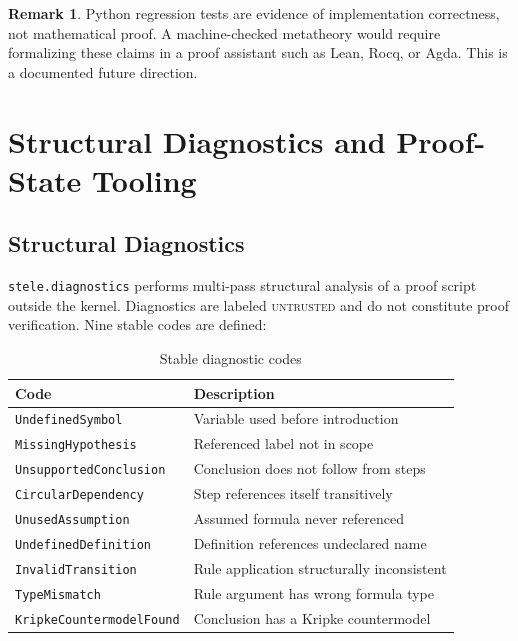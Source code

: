 \documentclass[11pt,a4paper]{article}
\theoremstyle{definition}
\newtheorem{remark}{Remark}
\theoremstyle{plain}
\newcommand{\untrusted}{\textsc{untrusted}}
\begin{document}
\begin{remark}
  Python regression tests are evidence of implementation
  correctness, not mathematical proof.
  A machine-checked metatheory would require formalizing these
  claims in a proof assistant such as Lean, Rocq, or Agda.
  This is a documented future direction.
\end{remark}

\section{Structural Diagnostics and Proof-State Tooling}
\label{sec:diagnostics}

\subsection{Structural Diagnostics}

\texttt{stele.diagnostics} performs multi-pass structural
analysis of a proof script outside the kernel.
Diagnostics are labeled \untrusted{} and do not constitute
proof verification.
Nine stable codes are defined:

\begin{table}[H]
\centering
\caption{Stable diagnostic codes}
\begin{tabular}{@{}ll@{}}
\toprule
Code & Description \\
\midrule
\texttt{UndefinedSymbol} & Variable used before introduction \\
\texttt{MissingHypothesis} & Referenced label not in scope \\
\texttt{UnsupportedConclusion} & Conclusion does not follow from steps \\
\texttt{CircularDependency} & Step references itself transitively \\
\texttt{UnusedAssumption} & Assumed formula never referenced \\
\texttt{UndefinedDefinition} & Definition references undeclared name \\
\texttt{InvalidTransition} & Rule application structurally inconsistent \\
\texttt{TypeMismatch} & Rule argument has wrong formula type \\
\texttt{KripkeCountermodelFound} & Conclusion has a Kripke countermodel \\
\bottomrule
\end{tabular}
\end{table}
\end{document}
